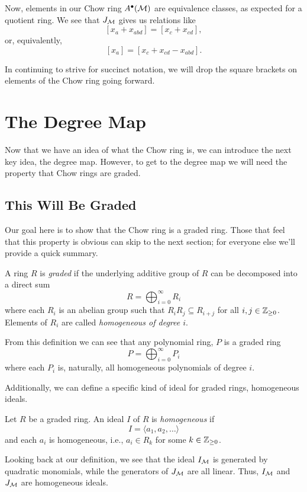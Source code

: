 \documentclass[12pt,oneside]{../../sfsuthesis}
\begin{document}
Now, elements in our Chow ring \( A^\bullet(\mathcal{M}) \) are equivalence classes, as expected for a quotient ring.
We see that \( J_{\mathcal{M}} \) gives us relations like
\[
    [x_a + x_{abd}] = [x_c + x_{cd}],
\]
or, equivalently,
\[
    [x_a] = [x_c + x_{cd} - x_{abd}].
\]

In continuing to strive for succinct notation, we will drop the square brackets on elements of the Chow ring going forward.

\section{The Degree Map}

Now that we have an idea of what the Chow ring is, we can introduce the next key idea, the degree map.
However, to get to the degree map we will need the property that Chow rings are graded.

\subsection{This Will Be Graded}
Our goal here is to show that the Chow ring is a graded ring.
Those that feel that this property is obvious can skip to the next section; for everyone else we'll provide a quick summary.
\begin{definition}
    A ring \( R \) is \emph{graded} if the underlying additive group of \( R \) can be decomposed into a direct sum
    \[
        R = \bigoplus_{i=0}^\infty R_i
    \]
    where each \( R_i \) is an abelian group such that \( R_i R_j \subseteq R_{i+j} \) for all \( i, j \in \mathbb{Z}_{\geq 0}\).
    Elements of \( R_i \) are called \emph{homogeneous of degree \( i \)}.
\end{definition}
From this definition we can see that any polynomial ring, \( P \) is a graded ring
\[
    P =  \bigoplus_{i=0}^\infty P_i
\]
where each \( P_i \) is, naturally, all homogeneous polynomials of degree \( i \).

Additionally, we can define a specific kind of ideal for graded rings, homogeneous ideals.
\begin{definition}
    Let \( R \) be a graded ring. An ideal \( I \) of \( R \) is \emph{homogeneous} if
    \[
        I = \langle a_1, a_2, \dots \rangle
    \]
    and each \( a_i \) is homogeneous, i.e., \( a_i \in R_k \) for some \( k \in \mathbb{Z}_{\geq 0} \).
\end{definition}
Looking back at our definition, we see that the ideal \( I_{\mathcal{M}} \) is generated by quadratic monomials, while the generators of \( J_{\mathcal{M}} \) are all linear.
Thus, \( I_{\mathcal{M}} \) and \( J_{\mathcal{M}} \) are homogeneous ideals.
\end{document}
